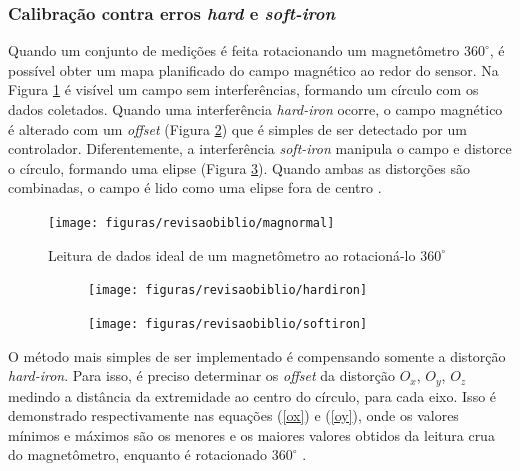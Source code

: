 \subsubsection{Calibração contra erros \textit{hard} e \textit{soft-iron}}

Quando um conjunto de medições é feita rotacionando um magnetômetro $ 360^{\circ} $, é possível obter um mapa planificado do campo magnético ao redor do sensor. Na Figura \ref{fig:magnormal} é visível um campo sem interferências, formando um círculo com os dados coletados. Quando uma interferência \textit{hard-iron} ocorre, o campo magnético é alterado com um \textit{offset} (Figura \ref{fig:hardiron}) que é simples de ser detectado por um controlador. Diferentemente, a interferência \textit{soft-iron} manipula o campo e distorce o círculo, formando uma elipse (Figura \ref{fig:softiron}). Quando ambas as distorções são combinadas, o campo é lido como uma elipse fora de centro \cite{site:magFierce}. 


\begin{figure}[!htb]
	\centering
	\caption{Leitura de dados ideal de um magnetômetro ao rotacioná-lo  $ 360^{\circ} $}
	\texttt{[image: figuras/revisaobiblio/magnormal]}
	\label{fig:magnormal}
\end{figure}

\begin{figure}[!htb]
	\centering
	\captionsetup[subfigure]{justification=centering}
	\caption{Impacto das interferências \textit{hard-iron} (a) e  \textit{soft-iron} (b) na leitura do magnetômetro em rotação de $ 360^{\circ} $}
	\begin{subfigure}[b]{0.49\textwidth}
		\centering
		\texttt{[image: figuras/revisaobiblio/hardiron]}
		\caption{}
		\label{fig:hardiron}
	\end{subfigure}
	\hfill
	\begin{subfigure}[b]{0.49\textwidth}
		\centering
		\texttt{[image: figuras/revisaobiblio/softiron]}
		\caption{}
		\label{fig:softiron}
	\end{subfigure}
	\label{}
\end{figure}


O método mais simples de ser implementado é compensando somente a distorção \textit{hard-iron}. Para isso, é preciso determinar os \textit{offset} da distorção $O_x$, $O_y$, $O_z$ medindo a distância da extremidade ao centro do círculo, para cada eixo. Isso é demonstrado respectivamente nas equações (\ref{ox}) e (\ref{oy}), onde os valores mínimos e máximos são os menores e os maiores valores obtidos da leitura crua do magnetômetro, enquanto é rotacionado $ 360^{\circ} $ \cite{site:magFierce}.  

